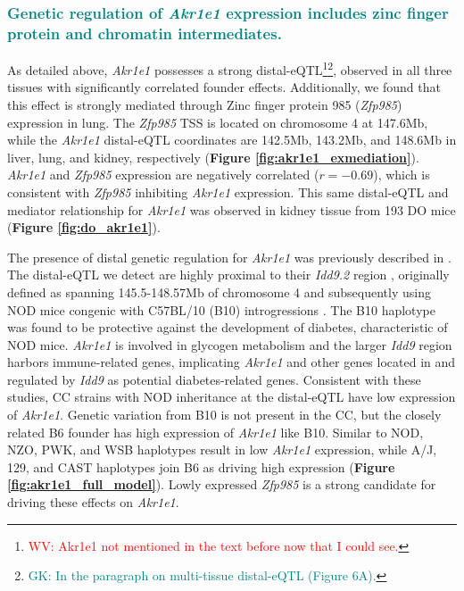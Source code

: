 \documentclass[9pt,twocolumn,twoside]{gsajnl}
\newcommand{\WV}[2]{\textcolor{red}{#1\footnote{\textcolor{red}{WV: #2}}}}
\newcommand{\GK}[2]{\textcolor{teal}{#1\footnote{\textcolor{teal}{GK: #2}}}}
\newcommand{\GKinline}[1]{\textcolor{teal}{#1}}
\begin{document}
\subsubsection{\GKinline{Genetic regulation of \textit{Akr1e1} expression includes zinc finger protein and chromatin intermediates.}}
As detailed above, \textit{Akr1e1} possesses a strong distal-eQTL\WV{}{Akr1e1 not mentioned in the text before now that I could see.}\GK{}{In the paragraph on multi-tissue distal-eQTL (Figure 6A).}, observed in all three tissues with significantly correlated founder effects. Additionally, we found that this effect is strongly mediated through Zinc finger protein 985 (\textit{Zfp985}) expression in lung. The \textit{Zfp985} TSS is located on chromosome 4 at 147.6Mb, while the \textit{Akr1e1} distal-eQTL coordinates are 142.5Mb, 143.2Mb, and 148.6Mb in liver, lung, and kidney, respectively (\textbf{Figure \ref{fig:akr1e1_exmediation}}). \textit{Akr1e1} and \textit{Zfp985} expression are negatively correlated ($r = -0.69$), which is consistent with \textit{Zfp985} inhibiting \textit{Akr1e1} expression. This same distal-eQTL and mediator relationship for \textit{Akr1e1} was observed in kidney tissue from 193 DO mice (\textbf{Figure \ref{fig:do_akr1e1}}).

The presence of distal genetic regulation for \textit{Akr1e1} was previously described in \cite{HamiltonWilliams2013}. The distal-eQTL we detect are highly proximal to their \textit{Idd9.2} region \citep{HamiltonWilliams2010}, originally defined as spanning 145.5-148.57Mb of chromosome 4 and subsequently using NOD mice congenic with C57BL/10 (B10) introgressions \cite{HamiltonWilliams2013}. The B10 haplotype was found to be protective against the development of diabetes, characteristic of NOD mice. \textit{Akr1e1} is involved in glycogen metabolism and the larger \textit{Idd9} region harbors immune-related genes, implicating \textit{Akr1e1} and other genes located in and regulated by \textit{Idd9} as potential diabetes-related genes. 
Consistent with these studies, CC strains with NOD inheritance at the distal-eQTL have low expression of \textit{Akr1e1}. Genetic variation from B10 is not present in the CC, but the closely related B6 founder has high expression of \textit{Akr1e1} like B10. Similar to NOD, NZO, PWK, and WSB haplotypes result in low \textit{Akr1e1} expression, while A/J, 129, and CAST haplotypes join B6 as driving high expression (\textbf{Figure \ref{fig:akr1e1_full_model}}). Lowly expressed \textit{Zfp985} is a strong candidate for driving these effects on \textit{Akr1e1}.
\end{document}

